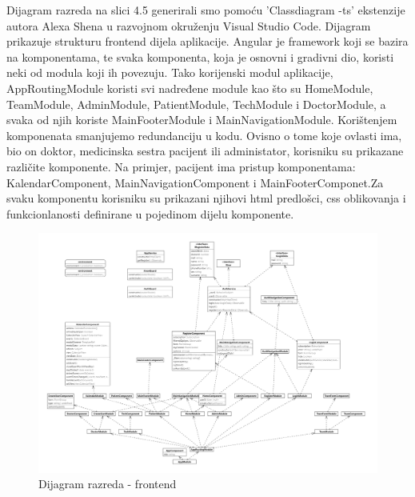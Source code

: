 		      \eject
		      
		      
		        Dijagram razreda na slici 4.5 generirali smo pomoću 'Classdiagram -ts' ekstenzije autora Alexa Shena u razvojnom okruženju Visual Studio Code. Dijagram prikazuje strukturu frontend dijela aplikacije. Angular je framework koji se bazira na komponentama, te svaka komponenta, koja je osnovni i gradivni dio, koristi neki od modula koji ih povezuju. Tako korijenski modul aplikacije, AppRoutingModule koristi svi nadređene module kao što su HomeModule, TeamModule, AdminModule, PatientModule, TechModule i DoctorModule, a svaka od njih koriste MainFooterModule i MainNavigationModule. Korištenjem komponenata smanjujemo redundanciju u kodu. Ovisno o tome koje ovlasti ima, bio on doktor, medicinska sestra pacijent ili administator, korisniku su prikazane različite komponente. Na primjer, pacijent ima pristup komponentama: KalendarComponent, MainNavigationComponent i MainFooterComponet.Za svaku komponentu korisniku su prikazani njihovi html predlošci, css oblikovanja i funkcionlanosti definirane u pojedinom dijelu komponente.
                 
		      
		   \begin{figure}[H]
			            \includegraphics[width=\textwidth]{slike/frontend_class_diagram.png} %
			          \caption{Dijagram razreda - frontend}
			            \label{fig:class2} %
		      \end{figure}
                 
                
			
			

